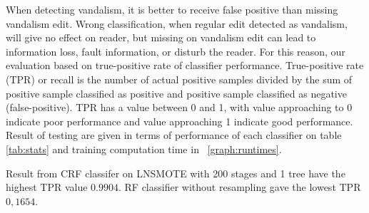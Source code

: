 When detecting vandalism, it is better to receive false positive than missing
vandalism edit.
Wrong classification, when regular edit detected as vandalism, will give no
effect on reader, but missing on vandalism edit can lead to information loss,
fault information, or disturb the reader.
For this reason, our evaluation based on true-positive rate of classifier
performance.
True-positive rate (TPR) or recall is the number of actual positive samples
divided by the sum of positive sample classified as positive and positive
sample classified as negative (false-positive).
TPR has a value between 0 and 1, with value approaching to 0 indicate poor
performance and value approaching 1 indicate good performance.
Result of testing are given in terms of performance of each classifier on table
\ref{tab:stats} and training computation time in
\figurename\ \ref{graph:runtimes}.

Result from CRF classifer on LNSMOTE with 200 stages and 1 tree have the
highest TPR value $0.9904$.
RF classifier without resampling gave the lowest TPR $0,1654$.

	

	
